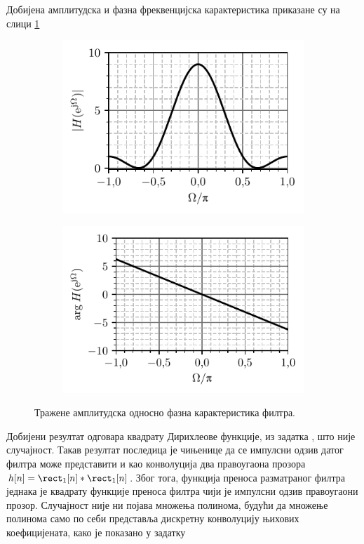 Добијена амплитудска и фазна фреквенцијска карактеристика приказане су на слици \ref{fig:\ID.hz}
\begin{figure}
    \centering
    \begin{subfigure}{0.49\textwidth}
        \centering
        \includegraphics{fig/zt_tri.pdf}
    \end{subfigure}
    \begin{subfigure}{0.49\textwidth}
        \centering
        \includegraphics{fig/zt_tri_faz.pdf}
    \end{subfigure}
    \caption{Тражене амплитудска односно фазна карактеристика филтра.}
    \label{fig:\ID.hz}
\end{figure}

Добијени резултат одговара квадрату Дирихлеове функције, из задатка , што није случајност. 
Такав резултат последица је чињенице да се импулсни одзив датог филтра може представити и као 
конволуција два правоугаона прозора $h[n] = \rect_1[n] \ast \rect_1[n]$. Због тога, функција преноса 
разматраног филтра једнака је квадрату функције преноса 
филтра чији је импулсни одзив правоугаони прозор. Случајност није ни појава множења полинома, будући да множење полинома само по 
себи представља дискретну конволуцију њихових коефицијената, како је показано у задатку 
